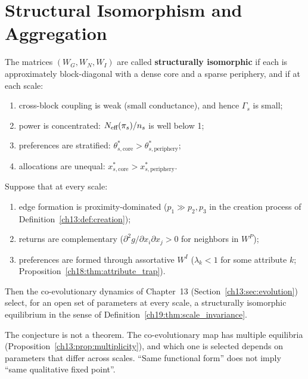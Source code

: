 \documentclass[../structural_economics_book.tex]{subfiles}
\begin{document}
\section{Structural Isomorphism and Aggregation}
\label{ch19:sec:theorem}

\begin{definition}\label{ch19:thm:scale_invariance}
The matrices $(W_G, W_N, W_I)$ are called \textbf{structurally isomorphic} if each is approximately block-diagonal with a dense core and a sparse periphery, and if at each scale:
\begin{enumerate}
\item[(a)] cross-block coupling is weak (small conductance), and hence $\Gamma_s$ is small;
\item[(b)] power is concentrated: $N_{\text{eff}}(\pi_s)/n_s$ is well below 1;
\item[(c)] preferences are stratified: $\theta^*_{s,\text{core}} > \theta^*_{s,\text{periphery}}$;
\item[(d)] allocations are unequal: $x^*_{s,\text{core}} > x^*_{s,\text{periphery}}$.
\end{enumerate}
\end{definition}

\begin{conjecture}\label{ch19:conj:mechanism}
Suppose that at every scale:
\begin{enumerate}
\item edge formation is proximity-dominated ($p_1 \gg p_2, p_3$ in the creation process of Definition~\ref{ch13:def:creation});
\item returns are complementary ($\partial^2 g / \partial x_i \partial x_j > 0$ for neighbors in $W^P$);
\item preferences are formed through assortative $W^I$ ($\lambda_k < 1$ for some attribute $k$; Proposition~\ref{ch18:thm:attribute_trap}).
\end{enumerate}
Then the co-evolutionary dynamics of Chapter~13 (Section~\ref{ch13:sec:evolution}) select, for an open set of parameters at every scale, a structurally isomorphic equilibrium in the sense of Definition~\ref{ch19:thm:scale_invariance}.
\end{conjecture}

The conjecture is not a theorem. The co-evolutionary map has multiple equilibria (Proposition~\ref{ch13:prop:multiplicity}), and which one is selected depends on parameters that differ across scales. ``Same functional form'' does not imply ``same qualitative fixed point''.
\end{document}
